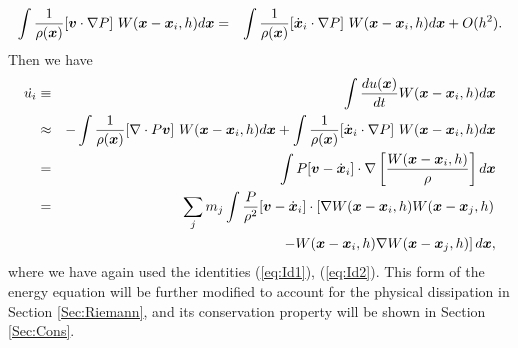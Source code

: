 \documentclass{cjour}
\newcommand{ \Vec   }[1]{ \mbox{\boldmath $ #1 $} }
\begin{document}
\begin{article}
\begin{eqnarray}
          \int \frac{1}{\rho(\Vec{x})} [\Vec{v} \cdot \nabla P]~
                                W(\Vec{x}-\Vec{x}_i,h) d\Vec{x}   
    & = & \int \frac{1}{\rho(\Vec{x})} [\dot{\Vec{x}}_i \cdot \nabla P]~
                                W(\Vec{x}-\Vec{x}_i,h) d\Vec{x}   
          + O(h^2).  
                                                      \nonumber \\
\end{eqnarray}
Then we have 
\begin{eqnarray}
            \dot{u_i}
 & \equiv  &
            \int \frac{du(\Vec{x})}{dt} W(\Vec{x}-\Vec{x}_i,h) d\Vec{x}
                                                          \nonumber \\
 & \approx & - \int \frac{1}{\rho(\Vec{x})} [\nabla \cdot P \Vec{v}]~
                                W(\Vec{x}-\Vec{x}_i,h) d\Vec{x}   
      +   \int \frac{1}{\rho(\Vec{x})} [\dot{\Vec{x}}_i \cdot \nabla P]~
                                W(\Vec{x}-\Vec{x}_i,h) d\Vec{x}  
                                                          \nonumber \\
 & = & \int P [ \Vec{v} - \dot{\Vec{x}}_i] 
          \cdot \nabla
                \left[ \frac{ W(\Vec{x}-\Vec{x}_i,h) }{\rho} \right]
                d\Vec{x}   
                                                          \nonumber \\
 & = & \sum_j m_j 
          \int \frac{ P }{\rho^2}
          [ \Vec{v} - \dot{\Vec{x}}_i ]  
          \cdot
              \left[ 
                      \nabla W(\Vec{x}  -\Vec{x}_i,h)
                             W(\Vec{x}  -\Vec{x}_j,h)
              \right. 
                                                          \nonumber \\
 &   & ~~~~~~~~~~~~~~~~~~~~~~~~~~~~~
              \left. 
                    -        W(\Vec{x}  -\Vec{x}_i,h)
                      \nabla W(\Vec{x}  -\Vec{x}_j,h)
              \right] 
              d\Vec{x}  , 
                                                          \nonumber \\
                                                        \label{eq:EoE4}
\end{eqnarray}
where we have again used the identities (\ref{eq:Id1}), 
(\ref{eq:Id2}). 
This form of the energy equation will be further modified 
to account for the physical dissipation in Section \ref{Sec:Riemann}, 
and its conservation property will be shown in Section \ref{Sec:Cons}.



\end{article}
\end{document}
